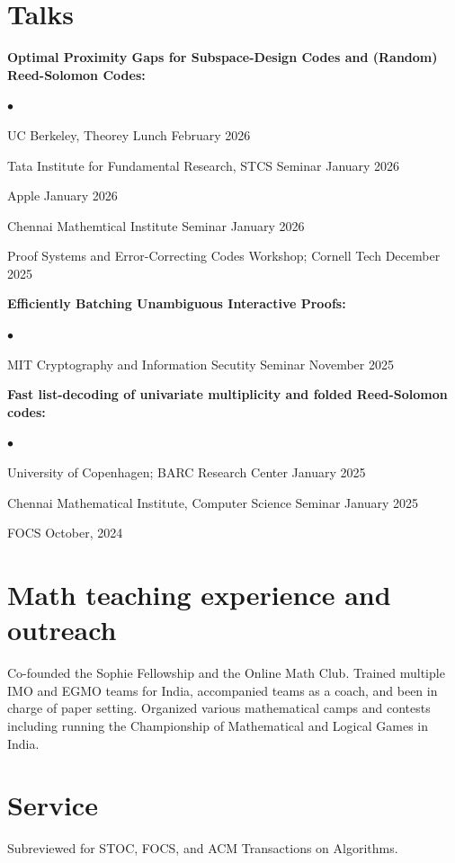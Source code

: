 \documentclass[margin,line, 10pt]{res}
\newenvironment{list2}{
  \begin{list}{$\bullet$}{%
      \setlength{\itemsep}{0in}
      \setlength{\parsep}{0in} \setlength{\parskip}{0in}
      \setlength{\topsep}{0in} \setlength{\partopsep}{0in} 
      \setlength{\leftmargin}{0.2in}}}{\end{list}}
\begin{document}
\begin{resume}
\section{\sc Talks}

{\bf Optimal Proximity Gaps for Subspace-Design Codes and (Random) Reed-Solomon Codes:}
\begin{list2}
    \item {\small UC Berkeley, Theorey Lunch} {\hfill February 2026}
    \item {\small Tata Institute for Fundamental Research, STCS Seminar} {\hfill January 2026}
    \item {\small Apple} {\hfill January 2026}
    \item {\small Chennai Mathemtical Institute Seminar} {\hfill January 2026}
    \item {\small Proof Systems and Error-Correcting Codes Workshop; Cornell Tech}   {\hfill December 2025}
\end{list2}


{\bf Efficiently Batching Unambiguous Interactive Proofs:}
\begin{list2}
    \item{\small MIT Cryptography and Information Secutity Seminar} {\hfill November 2025}
\end{list2}


{\bf Fast list-decoding of univariate multiplicity and folded Reed-Solomon codes:}
\begin{list2}
    \item {\small University of Copenhagen; BARC Research Center} \hfill January 2025
    \item {\small Chennai Mathematical Institute, Computer Science Seminar} \hfill January 2025
    \item {\small FOCS} \hfill October, 2024
\end{list2}

\section{\sc Math teaching experience and outreach}
Co-founded the Sophie Fellowship and the Online Math Club. Trained multiple IMO and EGMO teams for India, accompanied teams as a coach, and been in charge of paper setting. Organized various mathematical camps and contests including running the Championship of Mathematical and Logical Games in India.

\section{\sc Service}
Subreviewed for STOC, FOCS, and ACM Transactions on Algorithms.


\end{resume}
\end{document}
